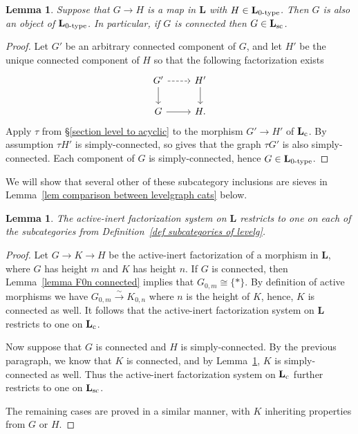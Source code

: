 \documentclass{amsart}
\numberwithin{theorem}{subsection}
\newtheorem{lemma}[theorem]{Lemma}
\theoremstyle{definition}
\newcommand{\isoto}{\xrightarrow{\sim}}
\newcommand{\name}[1]{\ensuremath{\text{\textup{#1}}}}
\newcommand{\levelg}{\mathbf{L}}
\newcommand{\levelgconn}{\levelg_{\name{c}}}
\begin{document}
\begin{lemma}\label{lemma simply connected sieves}
Suppose that $G \to H$ is a map in $\levelg$ with $H\in \levelg_{\name{0-type}}$. Then $G$ is also an object of $\levelg_{\name{0-type}}$.
In particular, if $G$ is connected then $G\in \levelg_{\name{sc}}$.
\end{lemma}
\begin{proof}
Let $G'$ be an arbitrary connected component of $G$, and let $H'$ be the unique connected component of $H$ so that the following factorization exists
\[ \begin{tikzcd}
G' \rar[dashed] \dar & H'\dar  \\
G \rar & H.
\end{tikzcd} \]
Apply $\tau$ from \S\ref{section level to acyclic} to the morphism $G' \to H'$ of $\levelgconn$.
By assumption $\tau H'$ is simply-connected, so \cite[Proposition 5.2.8]{hrybook} gives that the graph $\tau G'$ is also simply-connected.
Each component of $G$ is simply-connected, hence $G\in \levelg_{\name{0-type}}$.
\end{proof}

We will show that several other of these subcategory inclusions are sieves in Lemma~\ref{lem comparison between levelgraph cats} below.

\begin{lemma}\label{lemma general level graph factorization systems}
The active-inert factorization system on $\levelg$ restricts to one on each of the subcategories from Definition~\ref{def subcategories of levelg}.
\end{lemma}
\begin{proof}
Let $G\to K\to H$ be the active-inert factorization of a morphism in $\levelg$, where $G$ has height $m$ and $K$ has height $n$. 
If $G$ is connected, then Lemma~\ref{lemma F0n connected} implies that $G_{0,m}\cong \{*\}$. 
By definition of active morphisms we have $G_{0,m}\isoto K_{0,n}$ where $n$ is the height of $K$, hence, $K$ is connected as well. 
It follows that the active-inert factorization system on $\levelg$ restricts to one on $\levelgconn$.

Now suppose that $G$ is connected and $H$ is simply-connected.
By the previous paragraph, we know that $K$ is connected,
and by Lemma~\ref{lemma simply connected sieves}, $K$ is simply-connected as well.
Thus the active-inert factorization system on $\levelgconn$ further restricts to one on $\levelg_{\name{sc}}$.

The remaining cases are proved in a similar manner, with $K$ inheriting properties from $G$ or $H$.
\end{proof}
\end{document}
